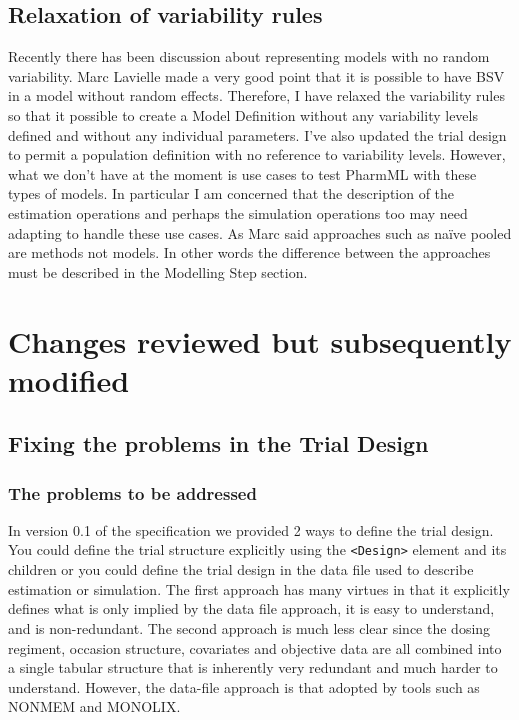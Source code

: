 \documentclass[a4paper,10pt]{article}
\newcommand{\pharmml}{PharmML\xspace}
\newcommand{\xelem}[1]{\texttt{<#1>}\index{XML Element!\texttt{<#1>}}}
\begin{document}
\subsection{Relaxation of variability rules}

Recently there has been discussion about representing models with no
random variability. Marc Lavielle made a very good point that it is
possible to have BSV in a model without random effects. Therefore, I
have relaxed the variability rules so that it possible to create a
Model Definition without any variability levels defined and without
any individual parameters. I've also updated the trial design to
permit a population definition with no reference to variability
levels. However, what we don't have at the moment is use cases to test
\pharmml with these types of models. In particular I am concerned that
the description of the estimation operations and perhaps the
simulation operations too may need adapting to handle these use
cases. As Marc said approaches such as na\"{i}ve pooled are methods
not models. In other words the difference between the approaches must
be described in the Modelling Step section.

\section{Changes reviewed but subsequently modified}

\subsection{Fixing the problems in the Trial Design}
\label{sec:trialdesignchanges}

\subsubsection{The problems to be addressed}

In version 0.1 of the specification we provided 2 ways to define the
trial design. You could define the trial structure explicitly using
the \xelem{Design} element and its children or you could define the
trial design in the data file used to describe estimation or
simulation. The first approach has many virtues in that it explicitly
defines what is only implied by the data file approach, it is easy to
understand, and is non-redundant. The second approach is much less
clear since the dosing regiment, occasion structure, covariates and
objective data are all combined into a single tabular structure that
is inherently very redundant and much harder to understand. However,
the data-file approach is that adopted by tools such as NONMEM and
MONOLIX.
\end{document}
